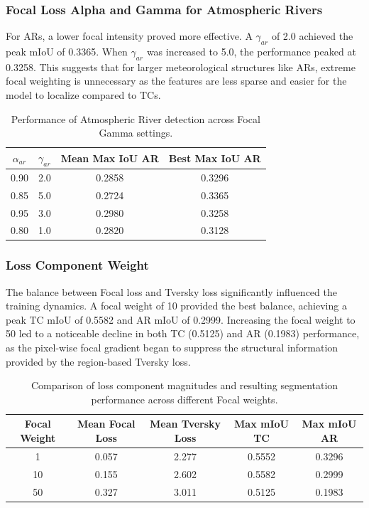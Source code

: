 \subsubsection{Focal Loss Alpha and Gamma for Atmospheric Rivers}
For ARs, a lower focal intensity proved more effective. A $\gamma_{ar}$ of 2.0 achieved the peak mIoU of 0.3365. When $\gamma_{ar}$ was increased to 5.0, the performance peaked at 0.3258. This suggests that for larger meteorological structures like ARs, extreme focal weighting is unnecessary as the features are less sparse and easier for the model to localize compared to TCs.

\begin{table}[h]
\centering
\begin{tabular}{@{}cccc@{}}
\toprule
$\alpha_{ar}$ & $\gamma_{ar}$ & Mean Max IoU AR& Best Max IoU AR\\ \midrule
0.90 & 2.0 & 0.2858 & 0.3296 \\
0.85 & 5.0 & 0.2724 & 0.3365 \\
0.95 & 3.0 & 0.2980 & 0.3258 \\
0.80 & 1.0 & 0.2820 & 0.3128 \\ \bottomrule
\end{tabular}
\caption{Performance of Atmospheric River detection across Focal Gamma settings.}
\end{table}

\subsubsection{Loss Component Weight}
The balance between Focal loss and Tversky loss significantly influenced the training dynamics. A focal weight of 10 provided the best balance, achieving a peak TC mIoU of 0.5582 and AR mIoU of 0.2999. Increasing the focal weight to 50 led to a noticeable decline in both TC (0.5125) and AR (0.1983) performance, as the pixel-wise focal gradient began to suppress the structural information provided by the region-based Tversky loss.

\begin{table}[h]
\centering
\begin{tabular}{@{}ccccc@{}}
\toprule
Focal Weight & Mean Focal Loss & Mean Tversky Loss & Max mIoU TC & Max mIoU AR \\ \midrule
1 & 0.057 & 2.277 & 0.5552 & 0.3296 \\
10 & 0.155 & 2.602 & 0.5582 & 0.2999 \\
50 & 0.327 & 3.011 & 0.5125 & 0.1983 \\ \bottomrule
\end{tabular}
\caption{Comparison of loss component magnitudes and resulting segmentation performance across different Focal weights.}
\end{table}

